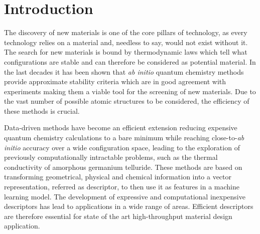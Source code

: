\cleardoublepage
\chapter*{Introduction}

The discovery of new materials is one of the core pillars of technology, as
every technology relies on a material and, needless to say, would not exist
without it\cite{tomellini2013commentary}.
The search for new materials is bound by thermodynamic laws which tell what
configurations are stable and can therefore be considered as potential
material.
In the last decades it has been shown that \textit{ab initio} quantum chemistry
methods provide approximate stability criteria which are in good agreement with
experiments\cite{jansen2015conceptual} making them a viable tool for the
screening of new materials\cite{ceder1998identification, andersson2006toward,
yang2012search, gomez2016design}.  Due to the vast number of possible atomic
structures to be considered, the efficiency of these methods is crucial.

Data-driven methods have become an efficient extension reducing expensive
quantum chemistry calculations to a bare minimum while reaching
close-to-\textit{ab initio} accuracy over a wide configuration
space\cite{bartok2018machine}, leading to the exploration of previously
computationally intractable problems, such as the thermal conductivity of
amorphous germanium telluride\cite{sosso2012thermal}.  These methods are based
on transforming geometrical, physical and chemical information into a vector
representation, referred as descriptor, to then use it as features in a machine
learning model.  The development of expressive and computational inexpensive
descriptors\cite{behler2011atom, bartok2013representing} has lead to
applications in a wide range of areas\cite{mansouri2018machine,
sosso2018understanding, basdogan2019machine}.  Efficient descriptors are
therefore essential for state of the art high-throughput material design
application.

